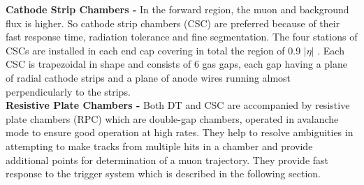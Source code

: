 {\bf Cathode Strip Chambers -} In the forward region, the muon and background flux is higher. So cathode strip chambers (CSC) are preferred because of their fast response time, radiation tolerance and fine segmentation. The four stations of CSCs are installed in each end cap covering in total the region of 0.9 \ls $|\eta|$ . Each CSC is trapezoidal in shape and consists of 6 gas gaps, each gap having a plane of radial cathode strips and a plane of anode wires running almost perpendicularly to the strips. \\ \newline 
{\bf Resistive Plate Chambers -} Both DT and CSC are accompanied by resistive plate chambers (RPC) which are double-gap chambers, operated in avalanche mode to ensure good operation at high rates. They help to resolve ambiguities in attempting to make tracks from multiple hits in a chamber and provide additional points for determination of a muon trajectory. They provide fast response to the trigger system which is described in the following section.
 
